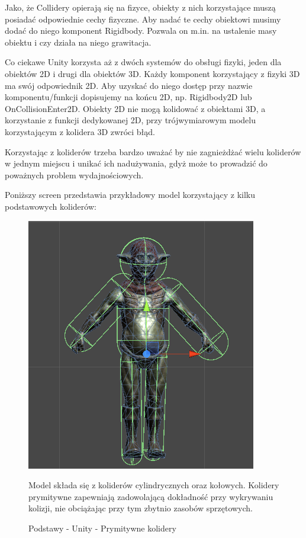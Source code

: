 \documentclass[12pt]{xmgr}
\begin{document}
Jako, że Collidery opierają się na fizyce, obiekty z nich korzystające muszą posiadać odpowiednie cechy fizyczne. Aby nadać te cechy obiektowi musimy dodać do niego komponent Rigidbody. Pozwala on m.in. na ustalenie masy obiektu i czy działa na niego grawitacja.

Co ciekawe Unity korzysta aż z dwóch systemów do obsługi fizyki, jeden dla obiektów 2D i drugi dla obiektów 3D. Każdy komponent korzystający z fizyki 3D ma swój odpowiednik 2D. Aby uzyskać do niego dostęp przy nazwie komponentu/funkcji dopisujemy na końcu 2D, np. Rigidbody2D lub OnCollisionEnter2D. Obiekty 2D nie mogą kolidować z obiektami 3D, a korzystanie z funkcji dedykowanej 2D, przy trójwymiarowym modelu korzystającym z kolidera 3D zwróci błąd.

Korzystając z koliderów trzeba bardzo uważać by nie zagnieżdżać wielu koliderów w jednym miejscu i unikać ich nadużywania, gdyż może to prowadzić do poważnych problem wydajnościowych.

Poniższy screen przedstawia przykładowy model korzystający z kilku podstawowych koliderów:

\begin{figure}[!htb]
    \begin{center}
    \includegraphics[scale=0.25]{Screeny/rodzial5screeny/model_prymitywne_kolidery}
    \end{center}
    \caption{Podstawy - Unity - Prymitywne kolidery}
Model składa się z koliderów cylindrycznych oraz kołowych. Kolidery prymitywne zapewniają zadowolającą dokładność przy wykrywaniu kolizji, nie obciążając przy tym zbytnio zasobów sprzętowych.
\end{figure}
\end{document}
